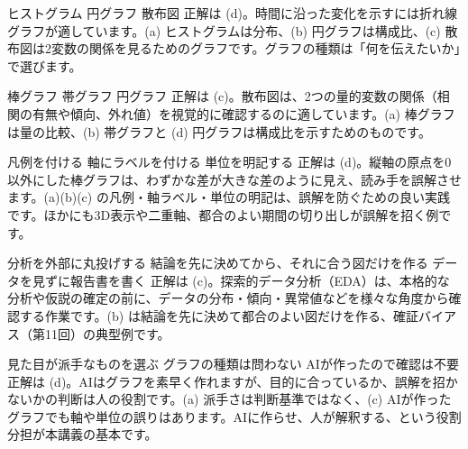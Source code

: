 
%
  {ヒストグラム}%
  {円グラフ}%
  {散布図}%
  {}%
  {正解は (d)。時間に沿った変化を示すには折れ線グラフが適しています。(a) ヒストグラムは分布、(b) 円グラフは構成比、(c) 散布図は2変数の関係を見るためのグラフです。グラフの種類は「何を伝えたいか」で選びます。}

%
  {棒グラフ}%
  {帯グラフ}%
  {}%
  {円グラフ}%
  {正解は (c)。散布図は、2つの量的変数の関係（相関の有無や傾向、外れ値）を視覚的に確認するのに適しています。(a) 棒グラフは量の比較、(b) 帯グラフと (d) 円グラフは構成比を示すためのものです。}

%
  {凡例を付ける}%
  {軸にラベルを付ける}%
  {単位を明記する}%
  {}%
  {正解は (d)。縦軸の原点を0以外にした棒グラフは、わずかな差が大きな差のように見え、読み手を誤解させます。(a)(b)(c) の凡例・軸ラベル・単位の明記は、誤解を防ぐための良い実践です。ほかにも3D表示や二重軸、都合のよい期間の切り出しが誤解を招く例です。}

%
  {分析を外部に丸投げする}%
  {結論を先に決めてから、それに合う図だけを作る}%
  {}%
  {データを見ずに報告書を書く}%
  {正解は (c)。探索的データ分析（EDA）は、本格的な分析や仮説の確定の前に、データの分布・傾向・異常値などを様々な角度から確認する作業です。(b) は結論を先に決めて都合のよい図だけを作る、確証バイアス（第11回）の典型例です。}

%
  {見た目が派手なものを選ぶ}%
  {グラフの種類は問わない}%
  {AIが作ったので確認は不要}%
  {}%
  {正解は (d)。AIはグラフを素早く作れますが、目的に合っているか、誤解を招かないかの判断は人の役割です。(a) 派手さは判断基準ではなく、(c) AIが作ったグラフでも軸や単位の誤りはあります。AIに作らせ、人が解釈する、という役割分担が本講義の基本です。}
